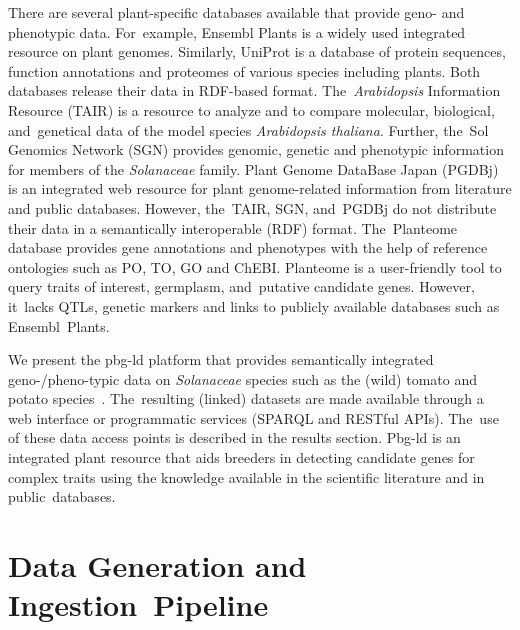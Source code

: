\documentclass[applsci,article,accept,moreauthors,pdftex]{Definitions/mdpi}
\begin{document}
There are several plant-specific databases available that provide geno- and phenotypic%
 data. For~example, Ensembl Plants is a widely used integrated resource on plant genomes. Similarly, UniProt is a database of protein sequences, function annotations and proteomes of various species including plants. Both databases release their data in RDF-based format. The~\textit{Arabidopsis}%
  Information Resource (TAIR) \cite{garcia2002tair} is a resource to analyze and to compare molecular, biological, and~genetical data of the model species \textit{Arabidopsis thaliana}.%
 	 Further, the~Sol Genomics Network (SGN) \cite{mueller2005sol} provides genomic, genetic and phenotypic information for members of the \textit{Solanaceae}%
 	  family. Plant Genome DataBase Japan (PGDBj) \cite{nakaya2017plant} is an integrated web resource for plant genome-related information from literature and public databases. However, the~TAIR, SGN, and~PGDBj do not distribute their data in a semantically interoperable (RDF) format. The~Planteome~\cite{Cooper2018} database provides gene annotations and phenotypes with the help of reference ontologies such as PO, TO, GO and ChEBI. Planteome is a user-friendly tool to query traits of interest, germplasm, and~putative candidate genes. However, it~lacks QTLs, genetic markers and links to publicly available databases such as Ensembl~Plants.

We present the pbg-ld platform that provides semantically integrated geno-/pheno-typic data on \textit{Solanaceae}%
species such as the (wild) tomato and potato species~\cite{kuzniar_arnold_2018_1458169}. The~resulting (linked) datasets are made available through a web interface or programmatic services (SPARQL and RESTful APIs). The~use of these data access points is described in the results section. Pbg-ld is an integrated plant resource that aids breeders in detecting candidate genes for complex traits using the knowledge available in the scientific literature and in public~databases.


\section{Data Generation and Ingestion~Pipeline}
\end{document}
